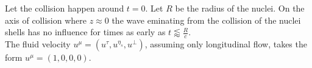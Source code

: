 Let the collision happen around $t=0$. Let $R$ be the radius of the nuclei. On the axis of collision where $z\approx 0$ the wave eminating from the collision of the nuclei shells has no influence for times as early as $t\lessapprox\frac{R}{c}$.\\
The fluid velocity $u^\mu=(u^\tau, u^{\eta_s},u^\perp)$, assuming only longitudinal flow, takes the form $u^\mu=(1,0,0,0)$.

